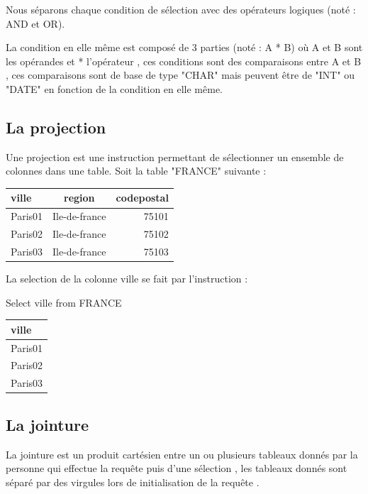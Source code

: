 \documentclass[oneside,13pt,a4paper]{report}
\begin{document}
    	    Nous séparons chaque condition de sélection avec des opérateurs logiques (noté : AND et OR).

	        La condition en elle même est composé de 3 parties (noté : A * B) où A et B sont les opérandes et * l'opérateur , ces conditions sont des comparaisons entre A et B , ces comparaisons sont de base de type "CHAR" mais peuvent être de "INT" ou "DATE" en fonction de la condition en elle même.

        \subsection{La projection}

         Une projection est une instruction permettant de sélectionner un ensemble de colonnes dans une table.
         Soit la table "FRANCE" suivante :



         \begin{tabular}{|l|c|r|}
          \hline
          ville & region & codepostal
          \\
          \hline
          Paris01 & Ile-de-france & 75101 \\
          Paris02 & Ile-de-france & 75102 \\
          Paris03 & Ile-de-france & 75103 \\
          \hline

         \end{tabular}


         La selection de la colonne ville se fait par l'instruction :

         Select ville from FRANCE

         

         \begin{tabular}{|l|}
          \hline
          ville
          \\
          \hline
          Paris01 \\
          Paris02 \\
          Paris03  \\
          \hline


         \end{tabular}
        \subsection{La jointure}

            La jointure est un produit cartésien entre un ou plusieurs tableaux donnés par la personne qui effectue la requête puis d'une sélection , les tableaux donnés sont séparé par des virgules lors de initialisation de la requête .
\end{document}
